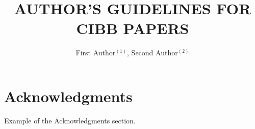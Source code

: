\documentclass[12pt,a4paper]{cibb}
\title{\large $\ $\\ \bf AUTHOR'S GUIDELINES FOR CIBB PAPERS}
\author{ First Author$^{(1)}$, Second Author$^{(2)}$}
\begin{document}
\thispagestyle{myheadings}
\pagestyle{myheadings}






\section*{\bf Acknowledgments}

Example of the Acknowledgments section.




{\fontsize{10}{10}\selectfont
\begin{thebibliography}{99}
\setlength{\parskip}{0pt}


\end{thebibliography}
}
\end{document}
